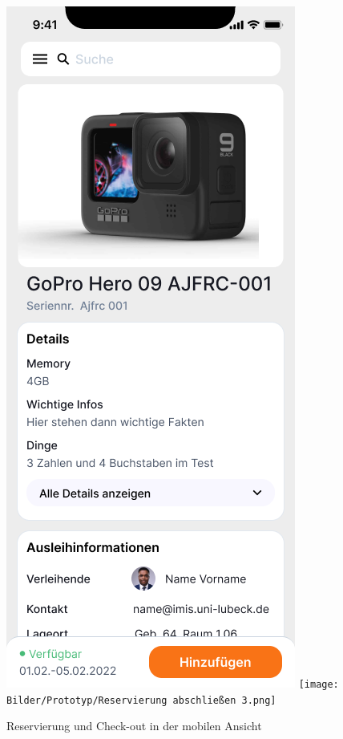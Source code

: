 \begin{figure}[h]
    \centering
    \includegraphics[scale=0.3]{Bilder/Prototyp/Neu/Datailansicht-1.png}\hspace{2em}
    \texttt{[image: Bilder/Prototyp/Reservierung abschließen 3.png]}
    \caption{Reservierung und Check-out in der mobilen Ansicht}
    \label{fig:p3}
\end{figure}